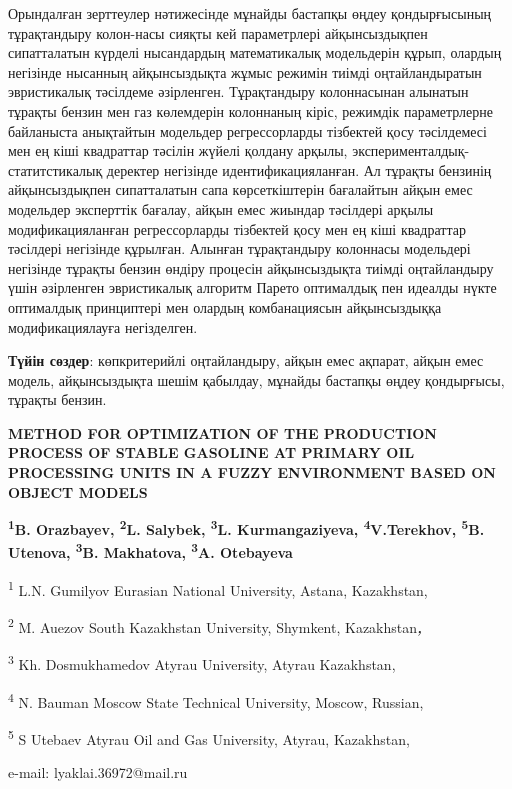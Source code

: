 Орындалған зерттеулер нәтижесінде мұнайды бастапқы өңдеу қондырғысының
тұрақтандыру колон-насы сияқты кей параметрлері айқынсыздықпен
сипатталатын күрделі нысандардың математикалық модельдерін құрып,
олардың негізінде нысанның айқынсыздықта жұмыс режимін тиімді
оңтайландыратын эвристикалық тәсілдеме әзірленген. Тұрақтандыру
колоннасынан алынатын тұрақты бензин мен газ көлемдерін колоннаның
кіріс, режимдік параметрлерне байланыста анықтайтын модельдер
регрессорларды тізбектей қосу тәсілдемесі мен ең кіші квадраттар тәсілін
жүйелі қолдану арқылы, эксперименталдық-статитстикалық деректер
негізінде идентификацияланған. Ал тұрақты бензинің айқынсыздықпен
сипатталатын сапа көрсеткіштерін бағалайтын айқын емес модельдер
эксперттік бағалау, айқын емес жиындар тәсілдері арқылы
модификацияланған регрессорларды тізбектей қосу мен ең кіші квадраттар
тәсілдері негізінде құрылған. Алынған тұрақтандыру колоннасы модельдері
негізінде тұрақты бензин өндіру процесін айқынсыздықта тиімді
оңтайландыру үшін әзірленген эвристикалық алгоритм Парето оптималдық пен
идеалды нүкте оптималдық принциптері мен олардың комбанациясын
айқынсыздыққа модификациялауға негізделген.

{\bfseries Түйін сөздер}: көпкритерийлі оңтайландыру, айқын емес ақпарат,
айқын емес модель, айқынсыздықта шешім қабылдау, мұнайды бастапқы өңдеу
қондырғысы, тұрақты бензин.

\newpage
\begin{center}
{\bfseries METHOD FOR OPTIMIZATION OF THE PRODUCTION PROCESS OF STABLE GASOLINE AT PRIMARY OIL PROCESSING UNITS IN A FUZZY ENVIRONMENT BASED ON OBJECT MODELS}

{\bfseries \textsuperscript{1}B. Orazbayev, \textsuperscript{2}L.
Salybek\envelope, \textsuperscript{3}L. Kurmangaziyeva,
\textsuperscript{4}V.Terekhov, \textsuperscript{5}B. Utenova, \textsuperscript{3}B. Makhatova, \textsuperscript{3}A.
Otebayeva}

\textsuperscript{1} L.N. Gumilyov Eurasian National University, Astana,
Kazakhstan,

\textsuperscript{2} M. Auezov South Kazakhstan University, Shymkent,
Kazakhstan\emph{{\bfseries ,}}

\textsuperscript{3} Kh. Dosmukhamedov Atyrau University, Atyrau
Kazakhstan,

\textsuperscript{4} N. Bauman Moscow State Technical University, Moscow,
Russian,

\textsuperscript{5} S Utebaev Atyrau Oil and Gas University, Atyrau,
Kazakhstan,

e-mail: lyaklai.36972@mail.ru
\end{center}

